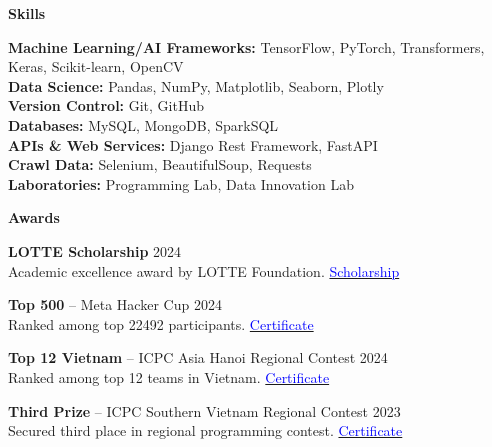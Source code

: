 \documentclass[10pt]{article}
\begin{document}
\begin{center}
    \textbf{Skills}
\end{center}

\textbf{Machine Learning/AI Frameworks:} TensorFlow, PyTorch, Transformers, Keras, Scikit-learn, OpenCV \\
\textbf{Data Science:} Pandas, NumPy, Matplotlib, Seaborn, Plotly \\
\textbf{Version Control:} Git, GitHub \\
\textbf{Databases:} MySQL, MongoDB, SparkSQL \\
\textbf{APIs \& Web Services:} Django Rest Framework, FastAPI \\
\textbf{Crawl Data:} Selenium, BeautifulSoup, Requests \\
\textbf{Laboratories:} Programming Lab, Data Innovation Lab

\begin{center}
    \vspace{0.05cm}
    \hrulefill
    \vspace{0.05cm}
\end{center}

\begin{center}
    \textbf{Awards}
\end{center}

\textbf{LOTTE Scholarship} \hfill 2024 \\
Academic excellence award by LOTTE Foundation. \hfill \href{https://drive.google.com/file/d/1-VoS_M4o_Dtu5mwoOiM1BGahttdvneo4/view?usp=sharing}{\textcolor{blue}{Scholarship}}

\textbf{Top 500} -- Meta Hacker Cup \hfill 2024 \\
Ranked among top 22492 participants. \hfill \href{https://www.facebook.com/codingcompetitions/hacker-cup/2024/certificate/484986933064775?source=facebook}{\textcolor{blue}{Certificate}}

\textbf{Top 12 Vietnam} -- ICPC Asia Hanoi Regional Contest \hfill 2024 \\
Ranked among top 12 teams in Vietnam. \hfill \href{https://github.com/taitruong256/Competitive-programming/blob/main/DH-Cong-nghiep-Thanh-pho-Ho-Chi-Minh-certificates-Top12-Viet-Nam.pdf}{\textcolor{blue}{Certificate}}

\textbf{Third Prize} -- ICPC Southern Vietnam Regional Contest \hfill 2023 \\
Secured third place in regional programming contest. \hfill \href{https://github.com/taitruong256/Competitive-programming/blob/main/2024-ICPC-Vietnam-Southern-Provincial-PC-MEDAL.pdf}{\textcolor{blue}{Certificate}}
\end{document}
